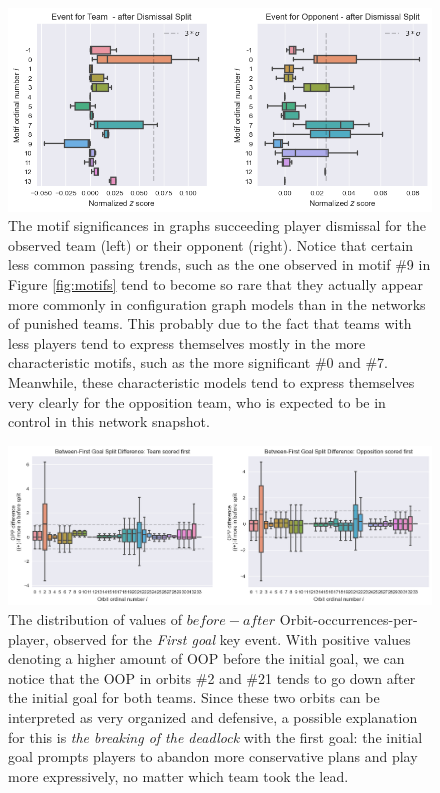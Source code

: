 \documentclass[9pt,twocolumn,twoside]{pnas-report}
\begin{document}
\begin{figure}[t]\centering
	\includegraphics[width=\linewidth]{MotifSignificanceDismissal.png}
	\caption{The motif significances in graphs succeeding player dismissal for the observed team (left) or their opponent (right). Notice that certain less common passing trends, such as the one observed in motif \#9 in Figure \ref{fig:motifs} tend to become so rare that they actually appear more commonly in configuration graph models than in the networks of punished teams. This probably due to the fact that teams with less players tend to express themselves mostly in the more characteristic motifs, such as the more significant \#0 and \#7. Meanwhile, these characteristic models tend to express themselves very clearly for the opposition team, who is expected to be in control in this network snapshot.}
	\label{fig:MotifSignificanceDismissal}
\end{figure}


\begin{figure}[t]\centering
	\includegraphics[width=\linewidth]{OrbitGoals.png}
	\caption{The distribution of values of $before - after$ Orbit-occurrences-per-player, observed for the \textit{First goal} key event. With positive values denoting a higher amount of OOP before the initial goal, we can notice that the OOP in orbits \#2 and \#21 tends to go down after the initial goal for both teams. Since these two orbits can be interpreted as very organized and defensive, a possible explanation for this is \textit{the breaking of the deadlock} with the first goal: the initial goal prompts players to abandon more conservative plans and play more expressively, no matter which team took the lead.}
	\label{fig:OrbitsGoals}
\end{figure}
\end{document}
